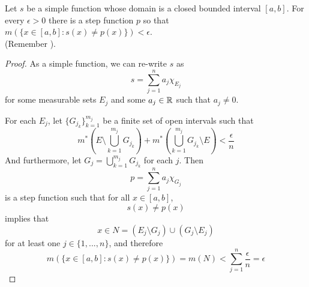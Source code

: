 \begin{pblm}\label{p:simplealmoststep}%
	Let $s$ be a simple function whose domain is a closed bounded interval 
	$[a,b]$. For every $\epsilon > 0$ there is a step function $p$ so that 
	$m(\{x \in [a,b]: s(x) \neq p(x)\}) < \epsilon$. \\ (Remember ). 
\begin{proof}
	As a simple function, we can re-write $s$ as 
	\begin{equation*}
		s = \sum\limits_{j=1}^n a_j \chi_{E_j}
	\end{equation*}
	for some measurable sets $E_j$ and some $a_j\in \mathbb{R}$ such that $a_j\neq 0$. 

	For each $E_j$, let $\{G_{j_k}\}_{k=1}^{m_j}$ be a finite set of open 
	intervals such that 
	\begin{equation*}
		m^\ast\left(E \setminus \bigcup\limits_{k=1}^{m_j} G_{j_k}\right) + 
		m^\ast\left(\bigcup\limits_{k=1}^{m_j} G_{j_k} \setminus E\right) <
		\frac{\epsilon}{n}
	\end{equation*}
	And furthermore, let $G_j = \bigcup\limits_{k=1}^{m_j} G_{j_k}$ for each $j$. Then 
	\begin{equation*}
		p = \sum\limits_{j=1}^n a_j \chi_{G_j}
	\end{equation*}
	is a step function such that for all $x \in [a, b]$, 
	\begin{equation*}
		s(x) \neq p(x)
	\end{equation*} 
	implies that 
	\begin{equation*}
		x \in N = \left(E_j \setminus G_j\right) \cup\left(G_j \setminus E_j\right)
	\end{equation*}
	for at least one $j \in \{1, ... , n\}$, and therefore 
	\begin{equation*}
		m(\{x \in [a,b] : s(x) \neq p(x)\}) = 
		m(N) < \sum\limits_{j=1}^n \frac{\epsilon}{n} = \epsilon
	\end{equation*}
\end{proof}
\end{pblm}

